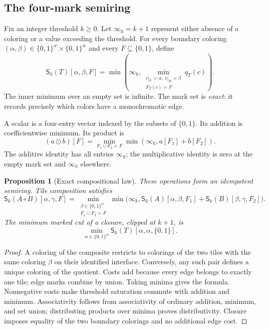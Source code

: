 \documentclass[11pt]{article}
\newtheorem{proposition}[theorem]{Proposition}
\theoremstyle{remark}\newtheorem{remark}[theorem]{Remark}
\newcommand{\Sig}{\mathsf S}
\newcommand{\infk}{\infty_k}
\begin{document}
\subsection{The four-mark semiring}
Fix an integer threshold $k\ge0$. Let $\infk=k+1$ represent either absence of a coloring or a value exceeding the threshold. For every boundary coloring $(\alpha,\beta)\in\{0,1\}^w\times\{0,1\}^w$ and every $F\subseteq\{0,1\}$, define
\begin{equation}
\label{eq:sig}
 \Sig_k(T)[\alpha,\beta,F]
 =\min\left(\infk,\min_{\substack{c|_L=\alpha,\ c|_R=\beta\\F_T(c)=F}}q_T(c)\right).
\end{equation}
The inner minimum over an empty set is infinite. The mark set is \emph{exact}: it records precisely which colors have a monochromatic edge.

A scalar is a four-entry vector indexed by the subsets of $\{0,1\}$. Its addition is coefficientwise minimum. Its product is
\begin{equation}
 (a\odot b)[F]=
 \min_{F_1\cup F_2=F}\min(\infk,a[F_1]+b[F_2]).
\end{equation}
The additive identity has all entries $\infk$; the multiplicative identity is zero at the empty mark set and $\infk$ elsewhere.

\begin{proposition}[Exact compositional law]
\label{prop:composition}
These operations form an idempotent semiring. Tile composition satisfies
\begin{equation}
\label{eq:composition}
 \Sig_k(A\circ B)[\alpha,\gamma,F]
 =\min_{\substack{\beta\in\{0,1\}^w\\F_1\cup F_2=F}}
   \min\bigl(\infk,\Sig_k(A)[\alpha,\beta,F_1]
                    +\Sig_k(B)[\beta,\gamma,F_2]\bigr).
\end{equation}
The minimum marked cut of a closure, clipped at $k+1$, is
\[
 \min_{\alpha\in\{0,1\}^w}
      \Sig_k(T)[\alpha,\alpha,\{0,1\}].
\]
\end{proposition}
\begin{proof}
A coloring of the composite restricts to colorings of the two tiles with the same coloring $\beta$ on their identified interface. Conversely, any such pair defines a unique coloring of the quotient. Costs add because every edge belongs to exactly one tile; edge marks combine by union. Taking minima gives the formula. Nonnegative costs make threshold saturation commute with addition and minimum. Associativity follows from associativity of ordinary addition, minimum, and set union; distributing products over minima proves distributivity. Closure imposes equality of the two boundary colorings and no additional edge cost.
\end{proof}
\end{document}
